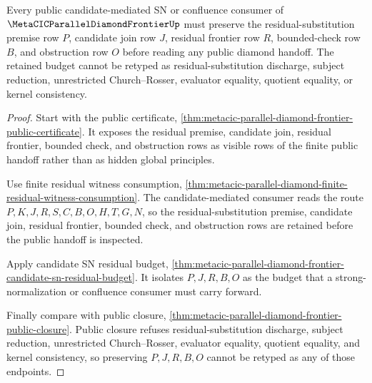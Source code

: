 \begin{theorem}
\label{thm:metacic-parallel-diamond-public-frontier-budget}
Every public candidate-mediated SN or confluence consumer of $\MetaCICParallelDiamondFrontierUp$ must preserve the residual-substitution premise row $P$, candidate join row $J$, residual frontier row $R$, bounded-check row $B$, and obstruction row $O$ before reading any public diamond handoff. The retained budget cannot be retyped as residual-substitution discharge, subject reduction, unrestricted Church--Rosser, evaluator equality, quotient equality, or kernel consistency.
\end{theorem}
\begin{proof}
Start with the public certificate, \autoref{thm:metacic-parallel-diamond-frontier-public-certificate}. It exposes the residual premise, candidate join, residual frontier, bounded check, and obstruction rows as visible rows of the finite public handoff rather than as hidden global principles.

Use finite residual witness consumption, \autoref{thm:metacic-parallel-diamond-finite-residual-witness-consumption}. The candidate-mediated consumer reads the route $P,K,J,R,S,C,B,O,H,T,G,N$, so the residual-substitution premise, candidate join, residual frontier, bounded check, and obstruction rows are retained before the public handoff is inspected.

Apply candidate SN residual budget, \autoref{thm:metacic-parallel-diamond-frontier-candidate-sn-residual-budget}. It isolates $P,J,R,B,O$ as the budget that a strong-normalization or confluence consumer must carry forward.

Finally compare with public closure, \autoref{thm:metacic-parallel-diamond-frontier-public-closure}. Public closure refuses residual-substitution discharge, subject reduction, unrestricted Church--Rosser, evaluator equality, quotient equality, and kernel consistency, so preserving $P,J,R,B,O$ cannot be retyped as any of those endpoints.
\end{proof}

